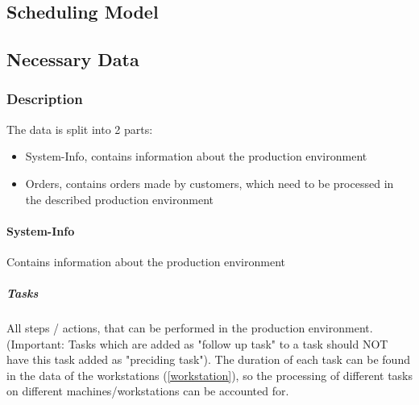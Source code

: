 \documentclass[a4paper,12pt,twoside]{scrreprt}
\begin{document}
\cleardoublepage   %
\thispagestyle{empty}
\begin{titlepage}
  \begin{flushleft}
  \chapter{Scheduling Model}
  
  \end{flushleft}
\end{titlepage}

\newpage
\section{Necessary Data}
\subsection{Description}
The data is split into 2 parts:
\begin{itemize}
	\item System-Info, contains information about the production environment
	\item Orders, contains orders made by customers, which need to be processed in the described production environment
\end{itemize}
\subsubsection{System-Info}
Contains information about the production environment
\paragraph{Tasks}
All steps / actions, that can be performed in the production environment.
(Important: Tasks which are added as "follow up task" to a task should NOT have this task added as "preciding task"). The duration of each task can be found in the data of the workstations (\autoref{workstation}), so the processing of different tasks on different machines/workstations can be accounted for.
\end{document}
